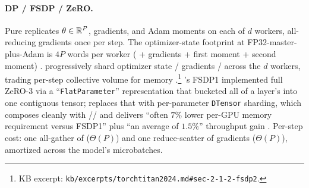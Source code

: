 \paragraph{DP / FSDP / ZeRO.} Pure  replicates  $\theta
\in \mathbb{R}^P$, gradients, and Adam moments on each of $d$ workers, all-
reducing gradients once per step. The optimizer-state footprint at
FP32-master-plus-Adam is $4P$ words per worker ( + gradients
+ first moment + second moment) \citep[\S 2]{kalamkar2019-bfloat16}.
 progressively shard optimizer state /
gradients /  across the $d$ workers, trading per-step
collective volume for memory \citep[\S 2.1.2]{torchtitan2024}.\footnote{KB
excerpt: \texttt{kb/excerpts/torchtitan2024.md\#sec-2-1-2-fsdp2}.}
's FSDP1 implemented full ZeRO-3 via a ``\texttt{FlatParameter}''
representation that bucketed all of a layer's  into one
contiguous tensor;  replaces that with per-parameter
\texttt{DTensor} sharding, which composes cleanly with // and
delivers ``often $7\%$ lower per-GPU memory requirement versus FSDP1''
plus ``an average of $1.5\%$'' throughput gain \citep[\S
2.1.2]{torchtitan2024}. Per-step cost: one all-gather of 
($\Theta(P)$) and one reduce-scatter of gradients ($\Theta(P)$),
amortized across the model's microbatches.

